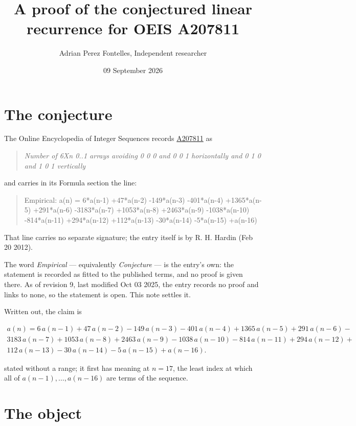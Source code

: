 \documentclass[11pt]{article}
\title{A proof of the conjectured linear recurrence for OEIS A207811}
\author{Adrian Perez Fontelles, Independent researcher}
\date{09 September 2026}
\theoremstyle{definition}
\begin{document}
\maketitle
\section{The conjecture}

The Online Encyclopedia of Integer Sequences records \href{https://oeis.org/A207811}{A207811} as

\begin{quote}\itshape Number of 6Xn 0..1 arrays avoiding 0 0 0 and 0 0 1 horizontally and 0 1 0 and 1 0 1 vertically\end{quote}

and carries in its Formula section the line:

\begin{quote}\ttfamily Empirical: a(n) = 6*a(n-1) +47*a(n-2) -149*a(n-3) -401*a(n-4) +1365*a(n-5) +291*a(n-6) -3183*a(n-7) +1053*a(n-8) +2463*a(n-9) -1038*a(n-10) -814*a(n-11) +294*a(n-12) +112*a(n-13) -30*a(n-14) -5*a(n-15) +a(n-16)\end{quote}

That line carries no separate signature; the entry itself is by R. H. Hardin (Feb 20 2012).

The word {\itshape Empirical} --- equivalently {\itshape Conjecture} --- is the entry's own: the statement is recorded as fitted to the published terms, and no proof is given there. As of revision 9, last modified Oct 03 2025, the entry records no proof and links to none, so the statement is open. This note settles it.

Written out, the claim is

\begin{multline*} a(n) = 6\,a(n-1) + 47\,a(n-2) - 149\,a(n-3) - 401\,a(n-4) + 1365\,a(n-5) + 291\,a(n-6) - \\ 3183\,a(n-7) + 1053\,a(n-8) + 2463\,a(n-9) - 1038\,a(n-10) - 814\,a(n-11) + 294\,a(n-12) + \\ 112\,a(n-13) - 30\,a(n-14) - 5\,a(n-15) + a(n-16). \end{multline*}

stated without a range; it first has meaning at $n = 17$, the least index at which all of $a(n-1),\dots,a(n-16)$ are terms of the sequence.

\section{The object}
\end{document}
